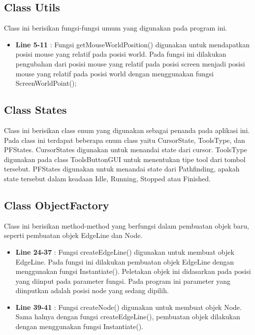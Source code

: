 \documentclass[12pt,a4paper,oneside]{article}
\begin{document}
\subsection{Class Utils}
Class ini berisikan fungsi-fungsi umum yang digunakan pada program ini.
\begin{itemize}
	\item \textbf{Line 5-11} : Fungsi getMouseWorldPosition() digunakan untuk mendapatkan posisi mouse yang relatif pada posisi world. Pada fungsi ini dilakukan pengubahan dari posisi mouse yang relatif pada posisi screen menjadi posisi mouse yang relatif pada posisi world dengan menggunakan fungsi ScreenWorldPoint();
\end{itemize}
\subsection{Class States}
Class ini berisikan class enum yang digunakan sebagai penanda pada aplikasi ini. Pada class ini terdapat beberapa enum class yaitu CursorState, ToolsType, dan PFStates. CursorStates digunakan untuk menandai state dari cursor. ToolsType digunakan pada class ToolsButtonGUI untuk menentukan tipe tool dari tombol tersebut. PFStates digunakan untuk menandai state dari Pathfinding, apakah state tersebut dalam keadaan Idle, Running, Stopped atau Finished.
\subsection{Class ObjectFactory}
Class ini berisikan method-method yang berfungsi dalam pembuatan objek baru, seperti pembuatan objek EdgeLine dan Node.
\begin{itemize}
	\item \textbf{Line 24-37} : Fungsi createEdgeLine() digunakan untuk membuat objek EdgeLine. Pada fungsi ini dilakukan pembuatan objek EdgeLine dengan menggunakan fungsi Instantiate(). Peletakan objek ini didasarkan pada posisi yang diinput pada parameter fungsi. Pada program ini parameter yang diinputkan adalah posisi node yang sedang dipilih.
	\item \textbf{Line 39-41} : Fungsi createNode() digunakan untuk membuat objek Node. Sama halnya dengan fungsi createEdgeLine(), pembuatan objek dilakukan dengan menggunakan fungsi Instantiate().
\end{itemize}
\end{document}
